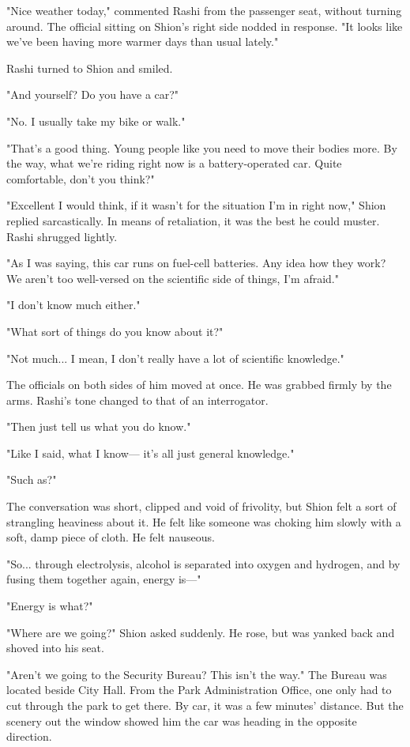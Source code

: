 "Nice weather today," commented Rashi from the passenger seat, without
turning around. The official sitting on Shion's right side nodded in
response. "It looks like we've been having more warmer days than usual
lately."

Rashi turned to Shion and smiled.

"And yourself? Do you have a car?"

"No. I usually take my bike or walk."

"That's a good thing. Young people like you need to move their bodies
more. By the way, what we're riding right now is a battery-operated car.
Quite comfortable, don't you think?"

"Excellent I would think, if it wasn't for the situation I'm in right
now," Shion replied sarcastically. In means of retaliation, it was the
best he could muster. Rashi shrugged lightly.

"As I was saying, this car runs on fuel-cell batteries. Any idea how
they work? We aren't too well-versed on the scientific side of things,
I'm afraid."

"I don't know much either."

"What sort of things do you know about it?"

"Not much... I mean, I don't really have a lot of scientific knowledge."

The officials on both sides of him moved at once. He was grabbed firmly
by the arms. Rashi's tone changed to that of an interrogator.

"Then just tell us what you do know."

"Like I said, what I know--- it's all just general knowledge."

"Such as?"

The conversation was short, clipped and void of frivolity, but Shion
felt a sort of strangling heaviness about it. He felt like someone was
choking him slowly with a soft, damp piece of cloth. He felt nauseous.

"So... through electrolysis, alcohol is separated into oxygen and
hydrogen, and by fusing them together again, energy is---"

"Energy is what?"

"Where are we going?" Shion asked suddenly. He rose, but was yanked back
and shoved into his seat.

"Aren't we going to the Security Bureau? This isn't the way." The Bureau
was located beside City Hall. From the Park Administration Office, one
only had to cut through the park to get there. By car, it was a few
minutes' distance. But the scenery out the window showed him the car was
heading in the opposite direction.

